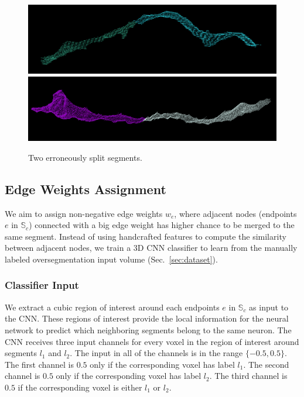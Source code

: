 \begin{figure}[t]
	\centering
	\includegraphics[width=0.92\linewidth]{./figures/split_error1.png}
	\includegraphics[width=0.92\linewidth]{./figures/split_error2.png}
	\caption{Two erroneously split segments. }
	\label{fig:merge_candidates}
\end{figure}

\subsection{Edge Weights Assignment}
We aim to assign non-negative edge weights $w_e$, where adjacent nodes (endpoints $e$ in $\mathbb{S}_c$) connected with a big edge weight has higher chance to be merged to the same segment.
Instead of using handcrafted features to compute the similarity between adjacent nodes, we train a 3D CNN classifier to learn from the manually labeled oversegmentation input volume (Sec.~\ref{sec:dataset}).

\subsubsection{Classifier Input}

We extract a cubic region of interest around each endpoints $e$ in $\mathbb{S}_c$ as input to the CNN. These regions of interest provide the local information for the neural network to predict which neighboring segments belong to the same neuron. The CNN receives three input channels for every voxel in the region of interest around segments $l_1$ and $l_2$. The input in all of the channels is in the range $\{-0.5, 0.5\}$. The first channel is $0.5$ only if the corresponding voxel has label $l_1$. The second channel is $0.5$ only if the corresponding voxel has label $l_2$. The third channel is $0.5$ if the corresponding voxel is either $l_1$ or $l_2$.


